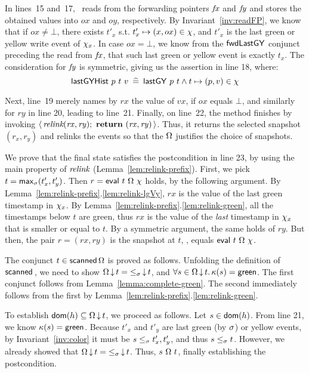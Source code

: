 In lines~15 and~17, \jyscan\ reads from the forwarding pointers $\mathit{fx}$
and $\mathit{fy}$ and stores the obtained values into $ox$ and $oy$,
respectively.  By Invariant~\ref{inv:readFP}, we know that if $ox \neq
\bot$, there exists $t'_x$ s.t. $t'_x \mapsto (x,ox) \in \chi$, and
$t'_x$ is the last green or yellow write event of $\chi_x$.  In case
$ox = \bot$, we know from the ${\mathsf{fwdLastGY}}$ conjunct preceding the read
from $\mathit{fx}$, that such last green or yellow event is exactly $t_x$.
%
The consideration for $\mathit{fy}$ is symmetric, giving us the assertion in
line 18, where:
%
\[
\hfill\histLGY\ p\ t\ v \eqdef
\lgVy\ p\ t \wedge t \hpts (p, v) \in \hist\hfill
\]

Next, line~19 merely names by $rx$ the value of $vx$, if $ox$ equals
$\bot$, and similarly for $ry$ in line 20, leading to
line~21. Finally, on line~22, the method finishes by invoking
$\langle\,\textit{relink}(\mathit{rx}, \mathit{ry});\ \text{\textbf{return}}\ (\mathit{rx},
\mathit{ry})\,\rangle$. Thus, it returns the selected snapshot $(r_x,r_y)$
and relinks the events so that the $\Omega$ justifies the choice
of snapshots.



We prove that the final state satisfies the postcondition in line 23,
by using the main property of $\textit{relink}$
(Lemma~\ref{lem:relink-prefix}).
%
First, we pick $t = \mathsf{max}_{\sigma}(t'_x, t'_y)$. Then $r =
\mathsf{eval}\ t\ \Omega\ \chi$ holds, by the following argument. By
Lemma~\ref{lem:relink-prefix}.\ref{lem:relink-lgVy}, $rx$ is the value
of the last green timestamp in $\chi_x$. By
Lemma~\ref{lem:relink-prefix}.\ref{lem:relink-green}, all the
timestamps below $t$ are green, thus $rx$ is the value of the
\emph{last} timestamp in $\chi_x$ that is smaller or equal to $t$.  By
a symmetric argument, the same holds of $ry$. But then, the pair $r =
(rx, ry)$ is the snapshot at $t$, \ie, equals
$\eval\ t\ \stableorder\ \hist$.

The conjunct $t \in \mathsf{scanned}\,\Omega$ is proved as
follows. Unfolding the definition of $\scanned$, we need to show
$\Omega\,{\downarrow}\,t = {\mathrel{\leq_\sigma}}\,{\downarrow}\,t$, and $\forall s\in
\Omega\,{\downarrow}\,t\mathord{.}\, \kappa(s) = \mathsf{green}$.  The first
conjunct follows from Lemma~\ref{lemma:complete-green}. The second
immediately follows from the first by
Lemma~\ref{lem:relink-prefix}.\ref{lem:relink-green}.

To establish $\mathsf{dom}(h) \subseteq \Omega\,{\downarrow}\,t$, we proceed
as follows. Let $s \in \mathsf{dom}(h)$. From line 21, we know $\kappa(s) =
\mathsf{green}$. Because $t'_x$ and $t'_y$ are last green (by
$\sigma$) or yellow events, by Invariant~\ref{inv:color} it must be
$s \mathrel{\leq_\sigma} t'_x, t'_y$, and thus $s \mathrel{\leq_\sigma} t$. However, we already showed
that $\Omega\,{\downarrow}\,t = {\mathrel{\leq_\sigma}}\,{\downarrow}\,t$. Thus,
$s\ {\stableorder}\ t$, finally establishing the postcondition.
